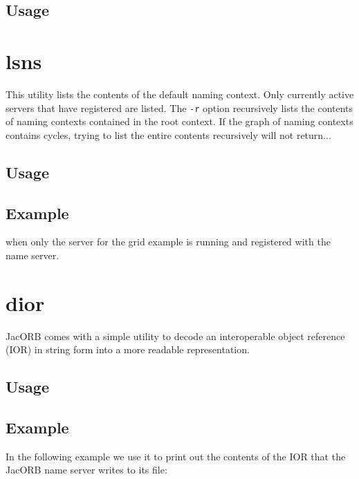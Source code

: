 \subsection*{Usage}


\section{lsns}

This utility  lists the contents  of the default naming  context. Only
currently active servers that have registered are listed. The {\tt -r}
option recursively lists the  contents of naming contexts contained in
the root  context. If  the graph of  naming contexts  contains cycles,
trying to list the entire contents recursively will not return...

\subsection*{Usage}



\subsection*{Example}


when only the server for the grid example is running and registered
with the name server.


\section{dior}

JacORB comes with a simple utility to decode an interoperable object reference
(IOR) in string form into a more readable representation.

\subsection*{Usage}


\subsection*{Example}

In the following example we use it to print out the contents of the
IOR that the JacORB name server writes to its file:


